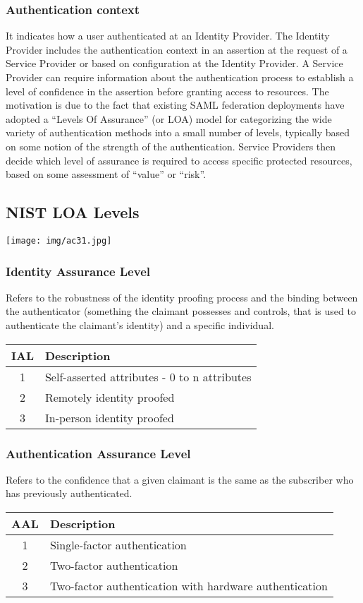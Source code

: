 \documentclass[a4paper, 10pt, titlepage]{article}
\begin{document}
\subsubsection*{Authentication context}
It indicates how a user authenticated at an Identity Provider. The Identity Provider includes the authentication context in an assertion at the request of a Service Provider or based on configuration at the Identity Provider. A Service Provider can require information about the authentication process to establish a level of confidence in the assertion before granting access to resources.
The motivation is due to the fact that existing SAML federation deployments have adopted a “Levels Of Assurance” (or LOA) model for categorizing the wide variety of authentication methods into a small number of levels, typically based on some notion of the strength of the authentication. Service Providers then decide which level of assurance is required to access specific protected resources, based on some assessment of “value” or “risk”.

\subsection*{NIST LOA Levels}
\begin{center}
\texttt{[image: img/ac31.jpg]}
\end{center}

\subsubsection*{Identity Assurance Level}
Refers to the robustness of the identity proofing process and the binding between the authenticator (something the claimant possesses and controls, that is used to authenticate the claimant’s identity) and a specific individual.
\begin{center}
\begin{tabular}{|c|l|} \hline
IAL & Description \\ \hline
1 & Self-asserted attributes - 0 to n attributes \\
2 & Remotely identity proofed\\
3 & In-person identity proofed\\ \hline
\end{tabular}
\end{center}
\subsubsection*{Authentication Assurance Level}
Refers to the confidence that a given claimant is the same as the subscriber who has previously authenticated.
\begin{center}
\begin{tabular}{|c|l|} \hline
AAL & Description \\ \hline
1 & Single-factor authentication\\
2 & Two-factor authentication\\
3 & Two-factor authentication with hardware authentication\\ \hline
\end{tabular}
\end{center}
\end{document}
